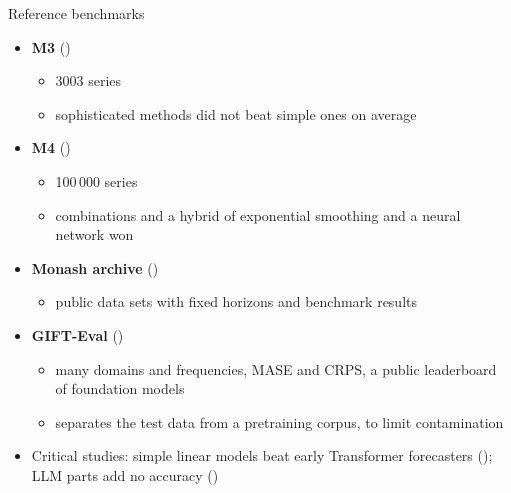 \begin{frame}{Reference benchmarks}
\itemsize{\footnotesize}
\begin{itemize}
    \item \textbf{M3} ()
    \begin{itemize}
        \item 3003 series
        \item sophisticated methods did not beat simple ones on average
    \end{itemize}
    \item \textbf{M4} ()
    \begin{itemize}
        \item 100\,000 series
        \item combinations and a hybrid of exponential smoothing and a neural network won
    \end{itemize}
    \item \textbf{Monash archive} ()
    \begin{itemize}
        \item public data sets with fixed horizons and benchmark results
    \end{itemize}
    \item \textbf{GIFT-Eval} ()
    \begin{itemize}
        \item many domains and frequencies, MASE and CRPS, a public leaderboard of foundation models
        \item separates the test data from a pretraining corpus, to limit contamination
    \end{itemize}
    \item Critical studies: simple linear models beat early Transformer forecasters (); LLM parts add no accuracy ()
\end{itemize}
\end{frame}

